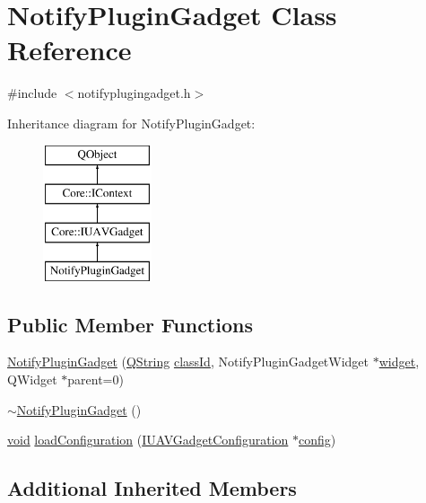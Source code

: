\hypertarget{class_notify_plugin_gadget}{\section{Notify\-Plugin\-Gadget Class Reference}
\label{class_notify_plugin_gadget}
}


{\ttfamily \#include $<$notifyplugingadget.\-h$>$}

Inheritance diagram for Notify\-Plugin\-Gadget\-:\begin{figure}[H]
\begin{center}
\leavevmode
\includegraphics[height=4.000000cm]{class_notify_plugin_gadget}
\end{center}
\end{figure}
\subsection*{Public Member Functions}
\begin{DoxyCompactItemize}
\item 
\hyperlink{group__notifyplugin_ga2550c9c08be7f6731350a3be6fbaba4a}{Notify\-Plugin\-Gadget} (\hyperlink{group___u_a_v_objects_plugin_gab9d252f49c333c94a72f97ce3105a32d}{Q\-String} \hyperlink{group___core_plugin_ga3878fde66a57220608960bcc3fbeef2c}{class\-Id}, Notify\-Plugin\-Gadget\-Widget $\ast$\hyperlink{group___core_plugin_gac74c76eef51e24e62a333fe0fd940cf6}{widget}, Q\-Widget $\ast$parent=0)
\item 
\hyperlink{group__notifyplugin_ga2b03f730db4ecb4673e46a323c9cbc45}{$\sim$\-Notify\-Plugin\-Gadget} ()
\item 
\hyperlink{group___u_a_v_objects_plugin_ga444cf2ff3f0ecbe028adce838d373f5c}{void} \hyperlink{group__notifyplugin_gad7b898c97fa3c65ea707934881f356e5}{load\-Configuration} (\hyperlink{class_core_1_1_i_u_a_v_gadget_configuration}{I\-U\-A\-V\-Gadget\-Configuration} $\ast$\hyperlink{deflate_8c_a4473b5227787415097004fd39f55185e}{config})
\end{DoxyCompactItemize}
\subsection*{Additional Inherited Members}


